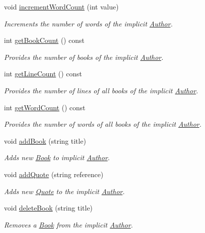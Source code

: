 \begin{DoxyCompactItemize}
void \hyperlink{class_author_af12d32bb751a9ac3e1508631e4d8fb8e}{increment\+Word\+Count} (int value)
\begin{DoxyCompactList}\small\item\em Increments the number of words of the implicit \hyperlink{class_author}{Author}. \end{DoxyCompactList}\item 
int \hyperlink{class_author_a78febe94924896f8d0ce218d5cd41786}{get\+Book\+Count} () const 
\begin{DoxyCompactList}\small\item\em Provides the number of books of the implicit \hyperlink{class_author}{Author}. \end{DoxyCompactList}\item 
int \hyperlink{class_author_af24acf9a0c70fc700edccfb956c2bace}{get\+Line\+Count} () const 
\begin{DoxyCompactList}\small\item\em Provides the number of lines of all books of the implicit \hyperlink{class_author}{Author}. \end{DoxyCompactList}\item 
int \hyperlink{class_author_a4899e9145b70a9e6fcad9a55b3b5285d}{get\+Word\+Count} () const 
\begin{DoxyCompactList}\small\item\em Provides the number of words of all books of the implicit \hyperlink{class_author}{Author}. \end{DoxyCompactList}\item 
void \hyperlink{class_author_a5836c0e00e740d4e9e9049e94f032cc3}{add\+Book} (string title)
\begin{DoxyCompactList}\small\item\em Adds new \hyperlink{class_book}{Book} to implicit \hyperlink{class_author}{Author}. \end{DoxyCompactList}\item 
void \hyperlink{class_author_a8605dbbab320ca251f3c64e782cf40b3}{add\+Quote} (string reference)
\begin{DoxyCompactList}\small\item\em Adds new \hyperlink{class_quote}{Quote} to the implicit \hyperlink{class_author}{Author}. \end{DoxyCompactList}\item 
void \hyperlink{class_author_ad48c2d5ae47d521bf5d4aa638bb86976}{delete\+Book} (string title)
\begin{DoxyCompactList}\small\item\em Removes a \hyperlink{class_book}{Book} from the implicit \hyperlink{class_author}{Author}. \end{DoxyCompactList}\item 

\end{DoxyCompactItemize}
